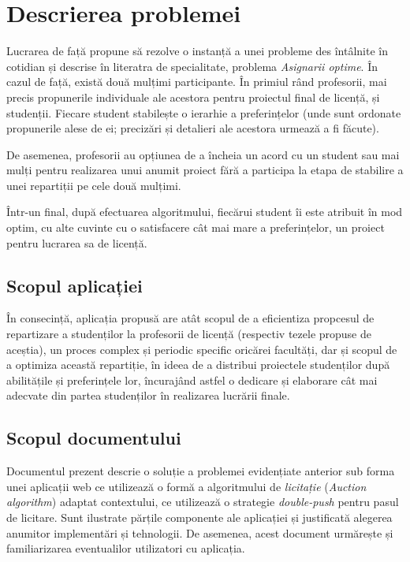 \chapter{Descrierea problemei}
Lucrarea de față propune să rezolve o instanță a unei probleme des întâlnite în cotidian și descrise în literatra de specialitate, problema \textit{Asignarii optime}. În cazul de față, există două mulțimi participante. În primiul rând profesorii, mai precis propunerile individuale ale acestora pentru proiectul final de licență, și studenții. Fiecare student stabilește o ierarhie a preferințelor (unde sunt ordonate propunerile alese de ei; precizări și detalieri ale acestora urmează a fi făcute).

De asemenea, profesorii au opțiunea de a încheia un acord cu un student sau mai mulți pentru realizarea unui anumit proiect fără a participa la etapa de stabilire a unei repartiții pe cele două mulțimi.

Într-un final, după efectuarea algoritmului, fiecărui student îi este atribuit în mod optim, cu alte cuvinte cu o satisfacere cât mai mare a preferințelor, un proiect pentru lucrarea sa de licență.

\section{Scopul aplicației}

În consecință, aplicația propusă are atât scopul de a eficientiza propcesul de repartizare a studenților la profesorii de licență (respectiv tezele propuse de aceștia), un proces complex și periodic specific oricărei facultăți, dar și scopul de a optimiza această repartiție, în ideea de a distribui proiectele studenților după abilitățile și preferințele lor, încurajând astfel o dedicare și elaborare cât mai adecvate din partea studenților în realizarea lucrării finale.

\section{Scopul documentului}

Documentul prezent descrie o soluție a problemei evidențiate anterior sub forma unei aplicații web ce utilizează o formă a algoritmului de \textit{licitație} (\textit{Auction algorithm}) adaptat contextului, ce utilizează o strategie \textit{double-push} pentru pasul de licitare. Sunt ilustrate părțile componente ale aplicației și justificată alegerea anumitor implementări și tehnologii. De asemenea, acest document urmărește și familiarizarea eventualilor utilizatori cu aplicația.

